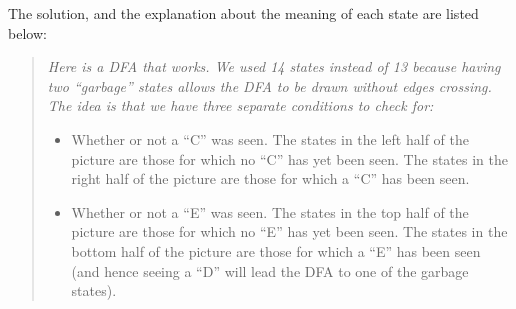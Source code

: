 \noindent The solution, and the explanation about the meaning of each state are listed below:
\begin{quote}
\it
  Here is a DFA that works. We used 14 states instead of 13 because having two ``garbage''
  states allows the DFA to be drawn without edges crossing. The idea is that we have three
  separate conditions to check for:
  \begin{itemize}
  \item Whether or  not a ``C'' was seen. The  states in the left half of  the picture are
    those for  which no  ``C'' has  yet been  seen. The states  in the  right half  of the
    picture are those for which a ``C'' has been seen.

  \item Whether or  not a ``E'' was  seen. The states in  the top half of  the picture are
    those for  which no  ``E'' has yet  been seen. The  states in  the bottom half  of the
    picture are those for which a ``E'' has  been seen (and hence seeing a ``D'' will lead
    the DFA to one of the garbage states).


\end{itemize}
\end{quote}
